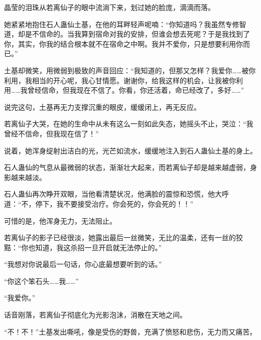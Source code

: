 \begin{this_body}
晶莹的泪珠从若离仙子的眼中流淌下来，划过她的脸庞，滴滴而落。

她紧紧地抱住石人蛊仙土基，在他的耳畔轻声呢喃：“你知道吗？我虽然专修智道，却是不信命的。当我算到宿命对我的安排，但谁会想去死呢？于是我找到了你，其实，你我的结合根本就不在宿命之中啊。我并不爱你，只是想要利用你而已。”

土基却微笑，用微弱到极致的声音回应：“我知道的，但那又怎样？我爱你……被你利用，我相当的开心呢，我心甘情愿。谢谢你，给我这样的机会，让我被你利用……我曾经信命，但我现在不信了。你看，你还活着，命已经改了，多好……”

说完这句，土基再无力支撑沉重的眼皮，缓缓闭上，再无反应。

若离仙子大哭，在她的生命中从未有这么一刻如此失态，她摇头不止，哭泣：“我曾经不信命，但我现在信了！”

说着，她浑身绽射出洁白的光，光芒如流水，缓缓地注入到石人蛊仙土基的身上。

石人蛊仙的气息从最微弱的状态，渐渐壮大起来，而若离仙子却是越来越虚弱，身影越来越淡。

石人蛊仙再次睁开双眼，当他看清楚状况，他满脸的震惊和恐慌，他大呼道：“不，停下，我不要接受治疗。你会死的，你会死的！！”

可惜的是，他浑身无力，无法阻止。

若离仙子的影子已经很淡，她露出最后一丝微笑，无比的温柔，还有一丝的狡黠：“你也知道，我这杀招一旦开启就无法停止的。”

“我想对你说最后一句话，你心底最想要听到的话。”

“你这个笨石头……我……”

“我爱你。”

话音刚落，若离仙子彻底化为光影泡沫，消散在天地之间。

“不！不！”土基发出嘶吼，像是受伤的野兽，充满了愤怒和悲伤，无力而又痛苦。

\end{this_body}

